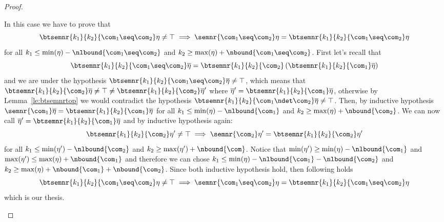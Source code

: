 \begin{proof}
\begin{inductive}
     In this case we have to prove that
    \begin{equation*}
      \btsemnr{k_1}{k_2}{\com_1\seq\com_2}\eta \neq \top
      \implies
      \semnr{\com_1 \seq\com_2} \eta = \btsemnr{k_1}{k_2}{\com_1 \seq\com_2}\eta
    \end{equation*}
    for all \(k_1 \leq \min(\eta) -\nlbound{\com_1\seq\com_2}\) and
    \(k_2 \geq \max(\eta) + \nbound{\com_1\seq\com_2}\). First let's
    recall that
    \begin{equation*}
      \btsemnr{k_1}{k_2}{\com_1\seq\com_2}\overline\eta
      =
      \btsemnr{k_1}{k_2}{\com_2}\left(\btsemnr{k_1}{k_2}{\com_1}\overline\eta\right)
    \end{equation*}
    and we are under the hypothesis
    \(\btsemnr{k_1}{k_2}{\com_1\seq\com_2}\overline\eta \neq \top\),
    which means that
    \(\btsemnr{k_1}{k_2}{\com_2}\overline\eta\neq \top \neq
    \btsemnr{k_1}{k_2}{\com_2}\overline\eta'\) where
    \(\overline\eta' = \btsemnr{k_1}{k_2}{\com_1}\overline\eta\),
    otherwise by Lemma~\ref{le:btsemnrtop} we would contradict the
    hypothesis
    \(\btsemnr{k_1}{k_2}{\com_1\ndet\com_2}\overline\eta\neq\top\).
    Then, by inductive hypothesis
    \(\semnr{\com_1}\overline\eta =
    \btsemnr{k_1}{k_2}{\com_1}\overline\eta\) for all
    \(k_1 \leq \min(\eta) - \nlbound{\com_1}\) and
    \(k_2 \geq \max(\eta) + \nbound{\com_2}\). We can now call
    \(\overline\eta' = \btsemnr{k_1}{k_2}{\com_1}\overline\eta\) and
    by inductive hypothesis again:
    \begin{equation*}
      \btsemnr{k_1}{k_2}{\com_2}\eta' \neq \top
      \implies
      \semnr{\com_2}\eta' = \btsemnr{k_1}{k_2}{\com_2}\eta'
    \end{equation*}
    for all \(k_1 \leq \min(\eta') - \nlbound{\com_2}\) and
    \(k_2 \geq \max(\eta') + \nbound{\com}\). Notice that
    \(\min(\eta') \geq \min(\eta) - \nlbound{\com_1}\) and
    \(\max(\eta') \leq \max(\eta) + \nbound{\com_1}\) and therefore we
    can chose
    \(k_1 \leq \min(\eta) - \nlbound{\com_1} - \nlbound{\com_2}\) and
    \(k_2 \geq \max(\eta) + \nbound{\com_1} + \nbound{\com_2}\). Since
    both inductive hypothesis hold, then following holds
    \begin{equation*}
      \btsemnr{k_1}{k_2}{\com_1\seq\com_2}\eta \neq \top
      \implies
      \semnr{\com_1\seq\com_2}\eta = \btsemnr{k_1}{k_2}{\com_1\seq\com_2}\eta
    \end{equation*}
    which is our thesis.
    

\end{inductive}
\end{proof}
